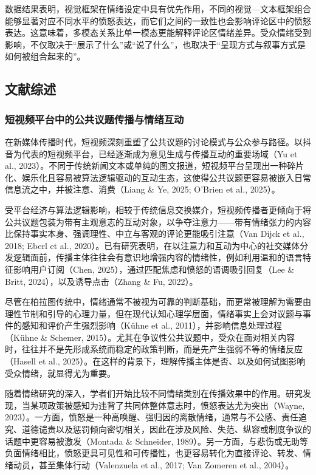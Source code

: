 \documentclass[
]{article}
\begin{document}
数据结果表明，视觉框架在情绪设定中具有优先作用，不同的视觉---文本框架组合能够显著对应不同水平的愤怒表达，而它们之间的一致性也会影响评论区中的愤怒表达。这意味着，多模态关系比单一模态更能解释评论区情绪差异。受众情绪受到影响，不仅取决于``展示了什么''或``说了什么''，也取决于``呈现方式与叙事方式是如何被组合起来的''。

\subsection{文献综述}\label{ux6587ux732eux7efcux8ff0}

\subsubsection{短视频平台中的公共议题传播与情绪互动}\label{ux77edux89c6ux9891ux5e73ux53f0ux4e2dux7684ux516cux5171ux8baeux9898ux4f20ux64adux4e0eux60c5ux7eeaux4e92ux52a8}

在新媒体传播时代，短视频深刻重塑了公共议题的讨论模式与公众参与路径。以抖音为代表的短视频平台，已经逐渐成为意见生成与传播互动的重要场域（Yu
et al.,
2023）。不同于传统新闻文本或单纯的图文报道，短视频平台呈现出一种碎片化、娱乐化且容易被算法逻辑驱动的互动生态，这使得公共议题更容易被嵌入日常信息流之中，并被注意、消费（Liang
\& Ye, 2025; O'Brien et al., 2025）。

受平台经济与算法逻辑影响，相较于传统信息交换媒介，短视频传播者更倾向于将公共议题包装为带有主观意志的互动对象，以争夺注意力------带有情绪张力的内容比保持事实本身、强调理性、中立与客观的评论更能吸引注意（Van
Dijck et al., 2018; Eberl et al.,
2020）。已有研究表明，在以注意力和互动为中心的社交媒体分发逻辑面前，传播主体往往会有意识地增强内容的情绪性，例如利用温和的语言特征影响用户订阅（Chen,
2025），通过匹配焦虑和愤怒的语调吸引回复（Lee \& Britt,
2024），以及诱导点击（Zhang \& Fu, 2022）。

尽管在柏拉图传统中，情绪通常不被视为可靠的判断基础，而更常被理解为需要由理性节制和引导的心理力量，但在现代认知心理学层面，情绪事实上会对议题与事件的感知和评价产生强烈影响（Kühne
et al., 2011），并影响信息处理过程（Kühne \& Schemer,
2015）。尤其在争议性公共议题中，受众在面对相关内容时，往往并不是先形成系统而稳定的政策判断，而是先产生强弱不等的情绪反应（Hasell
et al.,
2025）。在这样的背景下，理解传播主体是否、以及如何试图影响受众情绪，就显得尤为重要。

随着情绪研究的深入，学者们开始比较不同情绪类别在传播效果中的作用。研究发现，当某项政策被感知为违背了共同体整体意志时，愤怒表达尤为突出（Wayne,
2023）。一方面，愤怒是一种高唤醒、强归因的离散情绪，通常与不公感、责任追究、道德谴责以及惩罚倾向密切相关，因此在涉及风险、失范、纵容或制度争议的话题中更容易被激发（Montada
\& Schneider,
1989）。另一方面，与悲伤或无助等负面情绪相比，愤怒更具可见性和可传播性，也更容易转化为直接评论、转发、情绪动员，甚至集体行动（Valenzuela
et al., 2017; Van Zomeren et al., 2004）。
\end{document}
